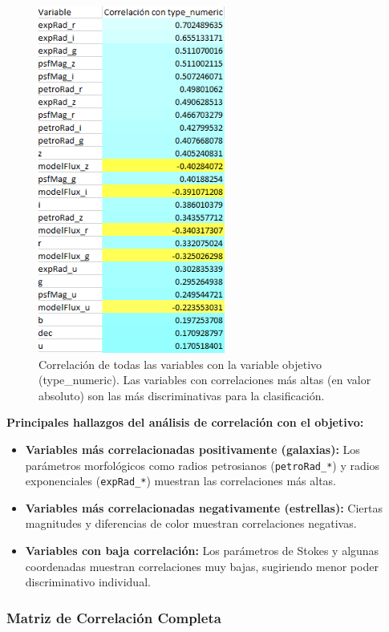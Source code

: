 \documentclass{article}
\begin{document}
\begin{figure}[H]
    \centering
\includegraphics[width=0.4\linewidth]{correlacion_1.png}
    \caption{Correlación de todas las variables con la variable objetivo (type\_numeric). Las variables con correlaciones más altas (en valor absoluto) son las más discriminativas para la clasificación.}
    \label{fig:correlacion_target}
\end{figure}

\textbf{Principales hallazgos del análisis de correlación con el objetivo:}

\begin{itemize}
    \item \textbf{Variables más correlacionadas positivamente (galaxias):} Los parámetros morfológicos como radios petrosianos (\texttt{petroRad\_*}) y radios exponenciales (\texttt{expRad\_*}) muestran las correlaciones más altas.
    
    \item \textbf{Variables más correlacionadas negativamente (estrellas):} Ciertas magnitudes y diferencias de color muestran correlaciones negativas.
    
    \item \textbf{Variables con baja correlación:} Los parámetros de Stokes y algunas coordenadas muestran correlaciones muy bajas, sugiriendo menor poder discriminativo individual.
\end{itemize}

\subsubsection{Matriz de Correlación Completa}
\end{document}
